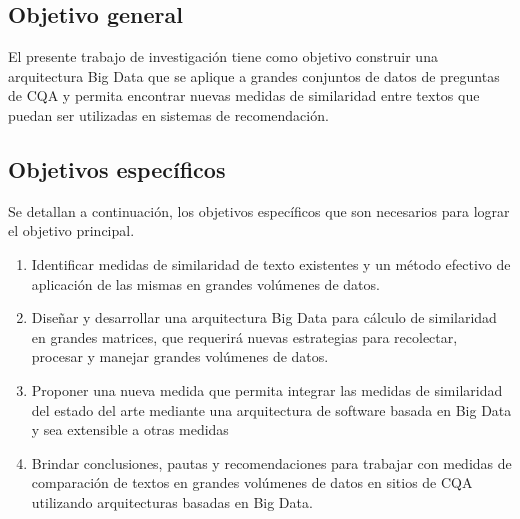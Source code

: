 \subsection{Objetivo general}
\noindent El presente trabajo de investigación tiene como objetivo construir una arquitectura Big Data que se aplique a grandes conjuntos de datos de preguntas de CQA y permita encontrar nuevas medidas de similaridad entre textos que puedan ser utilizadas en sistemas de recomendación.

\subsection{Objetivos específicos}
\noindent Se detallan a continuación, los objetivos específicos que son necesarios para lograr el objetivo principal.
\begin{enumerate}
	\item Identificar medidas de similaridad de texto existentes y un método efectivo de aplicación de las mismas en grandes volúmenes de datos.
	\item Diseñar y desarrollar una arquitectura Big Data para cálculo de similaridad en grandes matrices, que requerirá nuevas estrategias para recolectar, procesar y manejar grandes volúmenes de datos.
	\item Proponer una nueva medida que permita integrar las medidas de similaridad del estado del arte mediante una arquitectura de software basada en Big Data y sea extensible a otras medidas
	\item Brindar conclusiones, pautas y recomendaciones para trabajar con medidas de comparación de textos en grandes volúmenes de datos en sitios de CQA utilizando arquitecturas basadas en Big Data.
\end{enumerate}